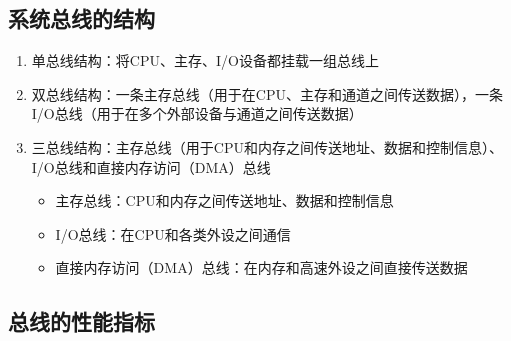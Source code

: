 \documentclass[./computer-organization-and-architecture.tex]{subfiles}
\begin{document}
    \subsection{系统总线的结构}

    \begin{enumerate}
        \item 单总线结构：将CPU、主存、I/O设备都挂载一组总线上
        \item 双总线结构：一条主存总线（用于在CPU、主存和通道之间传送数据），一条I/O总线（用于在多个外部设备与通道之间传送数据）
        \item 三总线结构：主存总线（用于CPU和内存之间传送地址、数据和控制信息）、I/O总线和直接内存访问（DMA）总线
        \begin{itemize}
            \item 主存总线：CPU和内存之间传送地址、数据和控制信息
            \item I/O总线：在CPU和各类外设之间通信
            \item 直接内存访问（DMA）总线：在内存和高速外设之间直接传送数据
        \end{itemize}
    \end{enumerate}

    \subsection{总线的性能指标}
\end{document}
